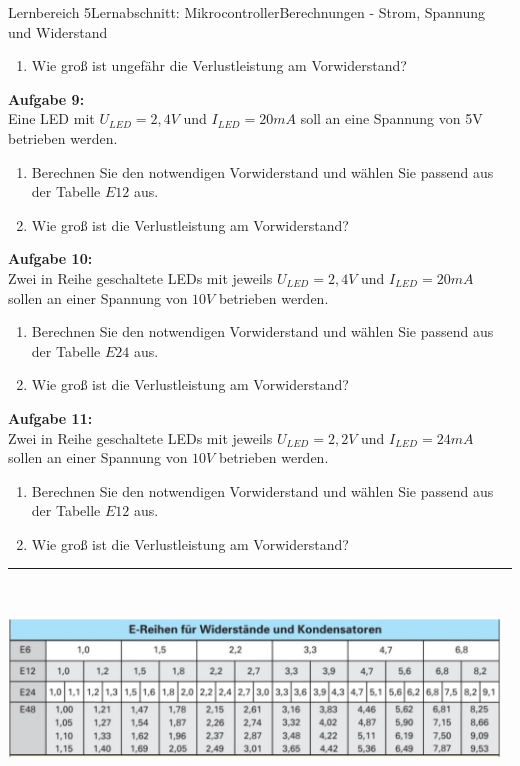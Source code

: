 \documentclass[oneside,openany,headings=optiontotoc,11pt,numbers=noenddot]{scrreprt}
\begin{document}
\begin{worksheet}{Lernbereich 5}{Lernabschnitt: Mikrocontroller}{Berechnungen - Strom, Spannung und Widerstand}
\begin{framed}
\begin{enumerate}[label=(\alph*)]
					\item Wie groß ist ungefähr die Verlustleistung am Vorwiderstand?
				\end{enumerate}
				\par\noindent
				\textbf{Aufgabe 9:}\\
				Eine LED mit \(U_{LED} = 2,4V\) und \(I_{LED} = 20mA\) soll an eine Spannung von 5V betrieben werden.
				\begin{enumerate}[label=(\alph*)]
					\item Berechnen Sie den notwendigen Vorwiderstand und wählen Sie passend aus der Tabelle \(E12\) aus.
					\item Wie groß ist die Verlustleistung am Vorwiderstand?
				\end{enumerate}
				\par\noindent
				\textbf{Aufgabe 10:}\\
				Zwei in Reihe geschaltete LEDs mit jeweils \(U_{LED} = 2,4V\) und \(I_{LED} = 20mA\) sollen an einer Spannung von \(10V\) betrieben werden.
				\begin{enumerate}[label=(\alph*)]
					\item Berechnen Sie den notwendigen Vorwiderstand und wählen Sie passend aus der Tabelle \(E24\) aus.
					\item Wie groß ist die Verlustleistung am Vorwiderstand?
				\end{enumerate}
				\par\noindent
				\textbf{Aufgabe 11:}\\
				Zwei in Reihe geschaltete LEDs mit jeweils \(U_{LED} = 2,2V\) und \(I_{LED} = 24mA\) sollen an einer Spannung von \(10V\) betrieben werden.
				\begin{enumerate}[label=(\alph*)]
					\item Berechnen Sie den notwendigen Vorwiderstand und wählen Sie passend aus der Tabelle \(E12\) aus.
					\item Wie groß ist die Verlustleistung am Vorwiderstand?
				\end{enumerate}
				\par\noindent
				\rule{0.98\textwidth}{0.1pt}\\
				\par\noindent
				\includegraphics[width=0.98\textwidth]{../99_Bilder/eReihe.png}
			\end{framed}
		\end{worksheet}	
\end{document}

